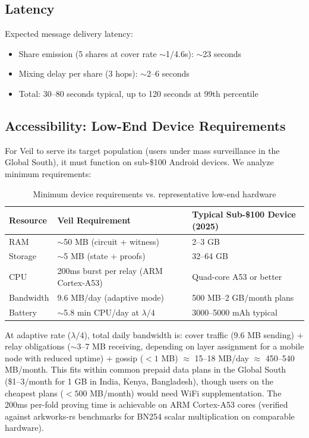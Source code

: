 \documentclass[11pt,a4paper]{article}
\begin{document}
\subsection{Latency}

Expected message delivery latency:
\begin{itemize}[nosep]
    \item Share emission (5 shares at cover rate $\sim$1/4.6s): $\sim$23 seconds
    \item Mixing delay per share (3 hops): $\sim$2--6 seconds
    \item Total: 30--80 seconds typical, up to 120 seconds at 99th percentile
\end{itemize}

\subsection{Accessibility: Low-End Device Requirements}
\label{sec:accessibility}

For Veil to serve its target population (users under mass surveillance in the Global South), it must function on sub-\$100 Android devices. We analyze minimum requirements:

\begin{table}[h]
\centering
\caption{Minimum device requirements vs. representative low-end hardware}
\begin{tabular}{@{}lll@{}}
\toprule
Resource & Veil Requirement & Typical Sub-\$100 Device (2025) \\
\midrule
RAM & $\sim$50 MB (circuit + witness) & 2--3 GB \\
Storage & $\sim$5 MB (state + proofs) & 32--64 GB \\
CPU & 200ms burst per relay (ARM Cortex-A53) & Quad-core A53 or better \\
Bandwidth & 9.6 MB/day (adaptive mode) & 500 MB--2 GB/month plans \\
Battery & $\sim$5.8 min CPU/day at $\lambda/4$ & 3000--5000 mAh typical \\
\bottomrule
\end{tabular}
\end{table}

At adaptive rate ($\lambda/4$), total daily bandwidth is: cover traffic (9.6 MB sending) + relay obligations ($\sim$3--7 MB receiving, depending on layer assignment for a mobile node with reduced uptime) + gossip ($< 1$ MB) $\approx$ 15--18 MB/day $\approx$ 450--540 MB/month. This fits within common prepaid data plans in the Global South (\$1--3/month for 1 GB in India, Kenya, Bangladesh), though users on the cheapest plans ($< 500$ MB/month) would need WiFi supplementation. The 200ms per-fold proving time is achievable on ARM Cortex-A53 cores (verified against arkworks-rs benchmarks for BN254 scalar multiplication on comparable hardware).
\end{document}
